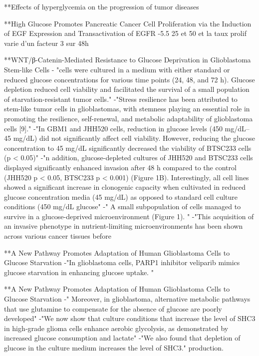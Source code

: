 \documentclass[11pt,a4paper]{article}
\begin{document}
**Effects of hyperglycemia on the progression of tumor diseases 


**High Glucose Promotes Pancreatic Cancer Cell
Proliferation via the Induction of EGF Expression and
Transactivation of EGFR
-5.5 25 et 50 et la taux prolif varie d'un facteur 3 sur 48h

**WNT/β-Catenin-Mediated Resistance to Glucose Deprivation in Glioblastoma Stem-like Cells
- "cells were cultured in a medium with either standard or reduced glucose concentrations for various time points (24, 48, and 72 h). Glucose depletion reduced cell viability and facilitated the survival of a small population of starvation-resistant tumor cells."
-"Stress resilience has been attributed to stem-like tumor cells in glioblastomas, with stemness playing an essential
role in promoting the resilience, self-renewal, and metabolic adaptability of glioblastoma cells [9]."
-"In GBM1 and JHH520 cells, reduction in glucose levels (450 mg/dL–45 mg/dL) did not significantly affect cell viability. However, reducing the glucose concentration to 45 mg/dL significantly decreased the viability of BTSC233 cells (p < 0.05)"
-"n addition, glucose-depleted cultures of JHH520 and BTSC233 cells displayed
significantly enhanced invasion after 48 h compared to the control (JHH520 p < 0.05, BTSC233
p < 0.001) (Figure 1B). Interestingly, all cell lines showed a significant increase in clonogenic capacity when cultivated in reduced glucose concentration media (45 mg/dL) as opposed to standard cell culture conditions (450 mg/dL glucose"
-" A small subpopulation of cells managed to survive in a glucose-deprived microenvironment (Figure 1). "
-"This acquisition of an invasive phenotype in nutrient-limiting microenvironments has been shown across various cancer tissues before

**A New Pathway Promotes Adaptation of Human Glioblastoma Cells to Glucose Starvation
-"In glioblastoma cells, PARP1 inhibitor veliparib mimics glucose starvation in enhancing glucose uptake. "

**A New Pathway Promotes Adaptation of Human Glioblastoma Cells to Glucose Starvation
-" Moreover, in glioblastoma, alternative metabolic pathways that use glutamine to compensate for the absence of glucose are poorly
developed"
-"We now show that culture conditions that increase the level of SHC3 in high‐grade glioma cells enhance aerobic glycolysis, as demonstrated by increased glucose consumption and lactate"
-"We also found that depletion of glucose in the culture medium increases the level of SHC3."
production. 
\end{document}
